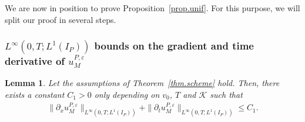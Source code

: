 \documentclass[11pt]{amsart}
\newtheorem{lemma}{Lemma}
\newcommand{\K}{\mathcal{K}}
\newcommand{\pa}{\partial}
\newcommand{\eps}{\varepsilon}
\begin{document}
We are now in position to prove Proposition~\ref{prop.unif}. For this purpose, we will split our proof in several steps.

 \subsubsection{$L^\infty(0,T;L^1(I_P))$ bounds on the gradient and time derivative of $u^{P,\eps}_M$}

\begin{lemma}\label{lem.LinftyL1estime}
Let the assumptions of Theorem~\ref{thm.scheme} hold. Then, there exists a constant $C_1>0$ only depending on $v_0$, $T$ and $\K$ such that
\begin{align}\label{LinftyL1.paxu.patu}
    \|\pa_x u^{P,\eps}_M\|_{L^\infty(0,T;L^1(I_P))} + \|\pa_t u^{P,\eps}_M\|_{L^\infty(0,T;L^1(I_P))} \leq C_1.
\end{align}
\end{lemma}
\end{document}
